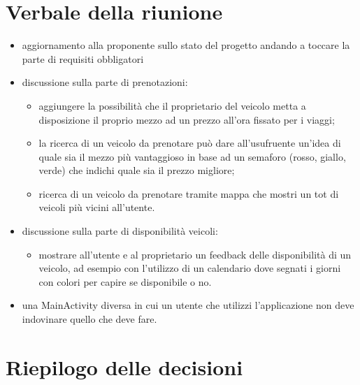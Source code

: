 \section{Verbale della riunione}
\begin{itemize}
	\item aggiornamento alla proponente sullo stato del progetto andando a toccare la parte di requisiti obbligatori
	\item discussione sulla parte di prenotazioni:
	\begin{itemize}
		\item aggiungere la possibilità che il proprietario del veicolo metta a disposizione il proprio mezzo ad un prezzo all'ora fissato per i viaggi;
		\item la ricerca di un veicolo da prenotare può dare all'usufruente un'idea di quale sia il mezzo più vantaggioso in base ad un semaforo (rosso, giallo, verde) che indichi quale sia il prezzo migliore;
		\item ricerca di un veicolo da prenotare tramite mappa che mostri un tot di veicoli più vicini all'utente. 
	\end{itemize}
	\item discussione sulla parte di disponibilità veicoli:
	\begin{itemize}
		\item mostrare all'utente e al proprietario un feedback delle disponibilità di un veicolo, ad esempio con l'utilizzo di un calendario dove segnati i giorni con colori per capire se disponibile o no.
	\end{itemize}
	\item una MainActivity diversa in cui un utente che utilizzi l'applicazione non deve indovinare quello che deve fare.
\end{itemize}	 

\pagebreak
\section{Riepilogo delle decisioni}

	
